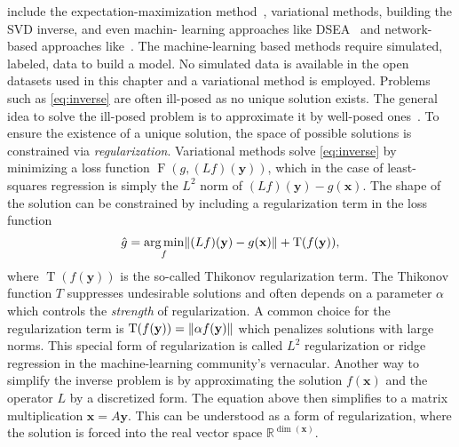 include the expectation-maximization method~\cite{em_algorithm}, variational methods, building the SVD inverse, and even 
machin- learning approaches like DSEA~\cite{bunse_inverse} and network-based approaches like~\cite{inverse_net_1,inverse_net_2,inverse_net_3}.
The machine-learning based methods require simulated, labeled, data to build a model. No simulated data is available in the open datasets used in this chapter
and a variational method is employed.
Problems such as \cref{eq:inverse} are often ill-posed as no unique solution exists.
The general idea to solve the ill-posed problem is to approximate it by well-posed ones~\cite[3]{benning_inverse_review}.
To ensure the existence of a unique solution, the space of possible solutions is constrained via \emph{regularization}. 
Variational methods solve \cref{eq:inverse} by minimizing a loss function $\operatorname{F}(g, (Lf)(\mathbf{y}))$, which in the case of least-squares regression is simply 
the $L^2$ norm of $(Lf)(\mathbf{y}) - g(\mathbf{x})$. The shape of the solution can be constrained by including a regularization term in the loss function 
\begin{equation}
  \hat{g} = \argmin_{f} \norm{ (Lf)(\mathbf{y}) - g(\mathbf{x})} + \operatorname{T}(f(\mathbf{y})),
\end{equation}
where $\operatorname{T}(f(\mathbf{y}))$ is the so-called Thikonov regularization term. The Thikonov function $T$ suppresses undesirable solutions 
and often depends on a parameter $\alpha$ which controls the \emph{strength} of regularization.
A common choice for the regularization term is $\operatorname{T}(f(\mathbf{y})) = \norm{\alpha f(\mathbf{y})}$ which penalizes solutions with large norms.
This special form of regularization is called $L^2$ regularization or ridge regression in the machine-learning community's vernacular. 
Another way to simplify the inverse problem  is by approximating the solution $f(\mathbf{x})$ and the operator $L$ by a discretized form. The equation above then simplifies to a matrix multiplication
$\mathbf{x} = A \mathbf{y}$. This can be understood as a form of regularization, where the solution is forced into the real vector space $\mathbb{R}^{\operatorname{dim}(\mathbf{x})}$.

